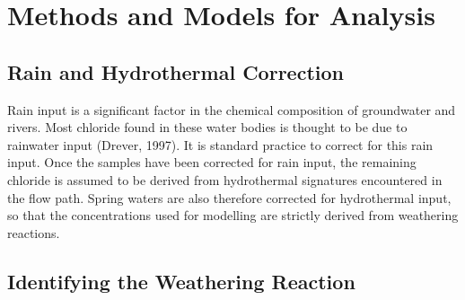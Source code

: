 



\newpage

\section{Methods and Models for Analysis}


\subsection{Rain and Hydrothermal Correction}

Rain input is a significant factor in the chemical composition of groundwater and rivers. Most chloride found in these water bodies is thought to be due to rainwater input (Drever, 1997). It is standard practice to correct for this rain input. Once the samples have been corrected for rain input, the remaining chloride is assumed to be derived from hydrothermal signatures encountered in the flow path. Spring waters are also therefore corrected for hydrothermal input, so that the concentrations used for modelling are strictly derived from weathering reactions.

\subsection{Identifying the Weathering Reaction}

